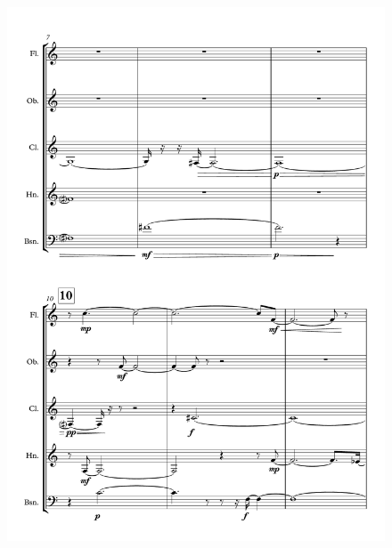 \begin{figure}[H]
    \centering
	\includegraphics[width=6.5in]{figures/Out_of_Focus_2.pdf}
\end{figure}

